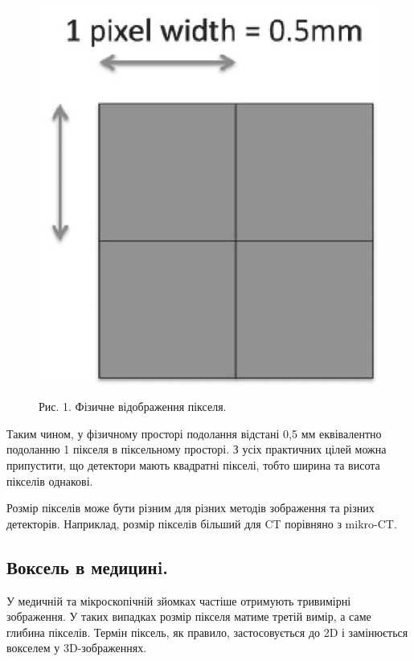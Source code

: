 \documentclass[a4paper,12pt]{article}
\begin{document}
    \begin{figure}
        \label{fig:image1}
        \centering
        \includegraphics[scale=0.5]{image1.png}

        Рис. 1. Фізичне відображення пікселя.
    \end{figure}

    Таким чином, у фізичному просторі подолання відстані 0,5 мм еквівалентно подоланню 1 пікселя в піксельному просторі.
    З усіх практичних цілей можна припустити, що детектори мають квадратні пікселі, тобто ширина та висота пікселів однакові.

    Розмір пікселів може бути різним для різних методів зображення та різних детекторів.
    Наприклад, розмір пікселів більший для CT порівняно з mikro-CT.

    \subsection{Воксель в медицинi.}\label{subsec:voxel_med}
    У медичній та мікроскопічній зйомках частіше отримують тривимірні зображення.
    У таких випадках розмір пікселя матиме третій вимір, а саме глибина пікселів.
    Термін піксель, як правило, застосовується до 2D і замінюється вокселем у 3D-зображеннях.
\end{document}
